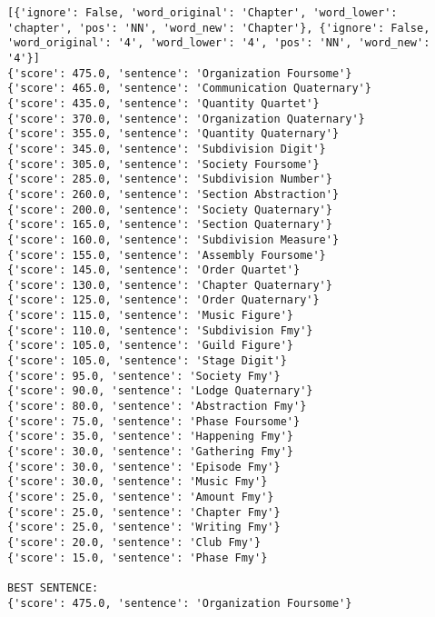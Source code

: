 \documentclass[12pt,a4paper,oneside]{book}
\begin{document}
\begin{verbatim}
[{'ignore': False, 'word_original': 'Chapter', 'word_lower': 'chapter', 'pos': 'NN', 'word_new': 'Chapter'}, {'ignore': False, 'word_original': '4', 'word_lower': '4', 'pos': 'NN', 'word_new': '4'}]
{'score': 475.0, 'sentence': 'Organization Foursome'}
{'score': 465.0, 'sentence': 'Communication Quaternary'}
{'score': 435.0, 'sentence': 'Quantity Quartet'}
{'score': 370.0, 'sentence': 'Organization Quaternary'}
{'score': 355.0, 'sentence': 'Quantity Quaternary'}
{'score': 345.0, 'sentence': 'Subdivision Digit'}
{'score': 305.0, 'sentence': 'Society Foursome'}
{'score': 285.0, 'sentence': 'Subdivision Number'}
{'score': 260.0, 'sentence': 'Section Abstraction'}
{'score': 200.0, 'sentence': 'Society Quaternary'}
{'score': 165.0, 'sentence': 'Section Quaternary'}
{'score': 160.0, 'sentence': 'Subdivision Measure'}
{'score': 155.0, 'sentence': 'Assembly Foursome'}
{'score': 145.0, 'sentence': 'Order Quartet'}
{'score': 130.0, 'sentence': 'Chapter Quaternary'}
{'score': 125.0, 'sentence': 'Order Quaternary'}
{'score': 115.0, 'sentence': 'Music Figure'}
{'score': 110.0, 'sentence': 'Subdivision Fmy'}
{'score': 105.0, 'sentence': 'Guild Figure'}
{'score': 105.0, 'sentence': 'Stage Digit'}
{'score': 95.0, 'sentence': 'Society Fmy'}
{'score': 90.0, 'sentence': 'Lodge Quaternary'}
{'score': 80.0, 'sentence': 'Abstraction Fmy'}
{'score': 75.0, 'sentence': 'Phase Foursome'}
{'score': 35.0, 'sentence': 'Happening Fmy'}
{'score': 30.0, 'sentence': 'Gathering Fmy'}
{'score': 30.0, 'sentence': 'Episode Fmy'}
{'score': 30.0, 'sentence': 'Music Fmy'}
{'score': 25.0, 'sentence': 'Amount Fmy'}
{'score': 25.0, 'sentence': 'Chapter Fmy'}
{'score': 25.0, 'sentence': 'Writing Fmy'}
{'score': 20.0, 'sentence': 'Club Fmy'}
{'score': 15.0, 'sentence': 'Phase Fmy'}

BEST SENTENCE:
{'score': 475.0, 'sentence': 'Organization Foursome'}



\end{verbatim}
\end{document}
